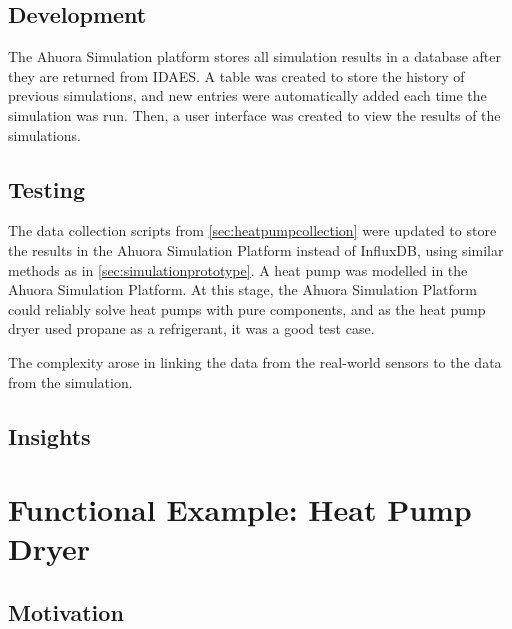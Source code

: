 \documentclass[12pt]{report}
\begin{document}
\section{Development}

The Ahuora Simulation platform stores all simulation results in a database after they are returned from IDAES. A table was created to store the history of previous simulations, and new entries were automatically added each time the simulation was run. Then, a user interface was created to view the results of the simulations.

\section{Testing}

The data collection scripts from \cref{sec:heatpumpcollection} were updated to store the results in the Ahuora Simulation Platform instead of InfluxDB, using similar methods as in \cref{sec:simulationprototype}. A heat pump was modelled in the Ahuora Simulation Platform. At this stage, the Ahuora Simulation Platform could reliably solve heat pumps with pure components, and as the heat pump dryer used propane as a refrigerant, it was a good test case. 

The complexity arose in linking the data from the real-world sensors to the data from the simulation. 




\section{Insights}




\chapter{Functional Example: Heat Pump Dryer}

\section{Motivation}
\end{document}
